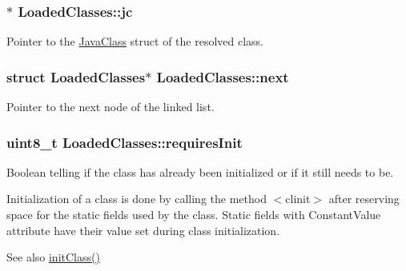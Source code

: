 \subsubsection[{\texorpdfstring{jc}{jc}}]{$\ast$ Loaded\+Classes\+::jc}\hypertarget{structLoadedClasses_a9926f0f305ae1f117b2709b17c9084d8}{}\label{structLoadedClasses_a9926f0f305ae1f117b2709b17c9084d8}


Pointer to the \hyperlink{structJavaClass}{Java\+Class} struct of the resolved class. 

\subsubsection[{\texorpdfstring{next}{next}}]{\setlength{\rightskip}{0pt plus 5cm}struct {\bf Loaded\+Classes}$\ast$ Loaded\+Classes\+::next}\hypertarget{structLoadedClasses_a66c15555a97e890e2967fac61bb540b8}{}\label{structLoadedClasses_a66c15555a97e890e2967fac61bb540b8}


Pointer to the next node of the linked list. 

\subsubsection[{\texorpdfstring{requires\+Init}{requiresInit}}]{\setlength{\rightskip}{0pt plus 5cm}uint8\+\_\+t Loaded\+Classes\+::requires\+Init}\hypertarget{structLoadedClasses_a4b06b6533c15ba1e1634b1e768343a84}{}\label{structLoadedClasses_a4b06b6533c15ba1e1634b1e768343a84}


Boolean telling if the class has already been initialized or if it still needs to be. 

Initialization of a class is done by calling the method $<$clinit$>$ after reserving space for the static fields used by the class. Static fields with \textquotesingle{}Constant\+Value\textquotesingle{} attribute have their value set during class initialization. \begin{DoxySeeAlso}{See also}
\hyperlink{jvm_8c_ae702b2c5a05e0f39c5edcaf78bcb4c95}{init\+Class()} 
\end{DoxySeeAlso}
